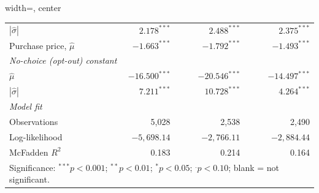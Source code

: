 \begin{table}[pos=H]
\begin{adjustbox}{width=\textwidth, center}
{\begin{tabular}{lrrr}
\quad\quad $|\hat{\sigma}|$          & $2.178^{***}$   & $2.488^{***}$   & $2.375^{***}$  \\[3pt]
\quad Purchase price, $\hat{\mu}$    & $-1.663^{***}$  & $-1.792^{***}$  & $-1.493^{***}$ \\[3pt]
\multicolumn{4}{l}{\textit{No-choice (opt-out) constant}} \\[2pt]
\quad $\hat{\mu}$                    & $-16.500^{***}$ & $-20.546^{***}$ & $-14.497^{***}$\\
\quad\quad $|\hat{\sigma}|$          & $7.211^{***}$   & $10.728^{***}$  & $4.264^{***}$  \\
\midrule
\multicolumn{4}{l}{\textit{Model fit}} \\[2pt]
\quad Observations                   & 5,028           & 2,538           & 2,490          \\
\quad Log-likelihood                 & $-5{,}698.14$   & $-2{,}766.11$   & $-2{,}884.44$  \\
\quad McFadden $R^{2}$               & 0.183           & 0.214           & 0.164          \\
\bottomrule
\multicolumn{4}{p{\dimexpr\linewidth-2\tabcolsep\relax}}{\footnotesize
  Significance: $^{***}p<0.001$; $^{**}p<0.01$; $^{*}p<0.05$; $^{.}p<0.10$; blank = not significant.} \\
\end{tabular}}
\end{adjustbox}
\end{table}
